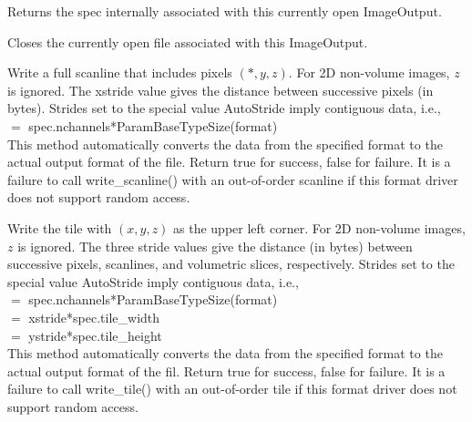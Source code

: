\apiend

Returns the spec internally associated with this currently open
{\kw ImageOutput}.
\apiend

Closes the currently open file associated with this {\kw ImageOutput}.
\apiend


Write a full scanline that includes pixels $(*,y,z)$.  For 2D non-volume
images, $z$ is ignored.  The {\kw xstride} value gives the distance
between successive pixels (in bytes).  Strides set to the special value
{\kw AutoStride} imply contiguous data, i.e., \\
 $=$ {\kw spec.nchannels*ParamBaseTypeSize(format)} \\
This method automatically converts the data from the specified {\kw
  format} to the actual output format of the file.  Return {\kw true}
for success, {\kw false} for failure.  It is a failure to call {\kw
  write_scanline()} with an out-of-order scanline if this format driver
does not support random access.

\apiend


Write the tile with $(x,y,z)$ as the upper left corner.  For 2D
non-volume images, $z$ is ignored.  The three stride values give the
distance (in bytes) between successive pixels, scanlines, and volumetric
slices, respectively.  Strides set to the special value {\kw AutoStride}
imply contiguous data, i.e., \\
 $=$ {\kw spec.nchannels*ParamBaseTypeSize(format)} \\
 $=$ {\kw xstride*spec.tile_width} \\
 $=$ {\kw ystride*spec.tile_height} \\
This method automatically converts the
data from the specified {\kw format} to the actual output format of the
fil.  Return {\kw true} for success, {\kw false} for failure.  It is a
failure to call {\kw write_tile()} with an out-of-order tile if this
format driver does not support random access.

